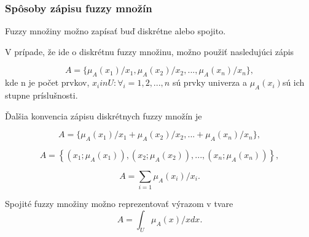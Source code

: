 \subsubsection{Spôsoby zápisu fuzzy množín}
Fuzzy množiny možno zapísať buď diskrétne alebo spojito. 

V prípade, že ide o diskrétnu fuzzy množinu, možno použiť nasledujúci zápis \cite{gregorref1}

\begin{equation}\label{disk0}
A = \{\mu_A(x_1)/x_1, \mu_A(x_2)/x_2, ... , \mu_A(x_n)/x_n\}, 
\end{equation}
kde n je počet prvkov, $x_i in U : \forall_i = 1, 2, ..., n$ sú prvky univerza a $\mu_A(x_i)$sú ich stupne príslušnosti.

Ďalšia konvencia zápisu diskrétnych fuzzy množín je  \cite{gregorUI} 

\begin{equation}\label{disk1}
A = \{\mu_A(x_1)/x_1 + \mu_A(x_2)/x_2, ...  + \mu_A(x_n)/x_n\}, 
\end{equation}

\begin{equation}\label{disk2}
A = \left\lbrace 
\left( x_1; \mu_A\left( x_1\right)  \right) , 
\left( x_2; \mu_A\left( x_2\right)  \right) , ... , 
\left( x_n; \mu_A\left( x_n\right)  \right) 
\right\rbrace , 
\end{equation}

\begin{equation}\label{disk3}
A = 
\sum\limits_{i=1} \mu_A(x_i)/x_i . 
\end{equation}

Spojité fuzzy množiny možno reprezentovať výrazom v tvare \cite{gregorref1}
\begin{equation}\label{disk4}
A = \int_{U}^{}  \mu_A(x)/xdx . 
\end{equation}
